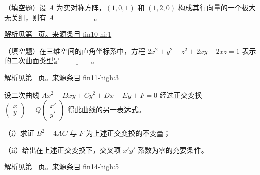 \documentclass[12pt,fontset=fandol]{ctexart}
\begin{document}
\begin{example}\label{ex:fin10-hi:1}

（填空题）设 $A$ 为实对称方阵，$(1,0,1)$ 和 $(1,2,0)$ 构成其行向量的一个极大无关组，则有 $A = $ $\underline{\qquad\qquad}$。

\par\hyperref[ans:fin10-hi:1]{解析见第~\pageref{ans:fin10-hi:1} 页。}\quad\href{https://github.com/lzxcr/cmc-mathematics/blob/64916fa1fdbc3e444a652eca204d5669058ee321/src/problems/finals/10/01.md}{来源条目 fin10-hi:1}

\end{example}

\begin{example}\label{ex:fin11-high:3}

（填空题）在三维空间的直角坐标系中，方程 $2x^{2}+y^{2}+z^{2}+2xy-2xz=1$ 表示的二次曲面类型是 $\underline{\qquad\qquad}$。

\par\hyperref[ans:fin11-high:3]{解析见第~\pageref{ans:fin11-high:3} 页。}\quad\href{https://github.com/lzxcr/cmc-mathematics/blob/64916fa1fdbc3e444a652eca204d5669058ee321/src/problems/finals/11/03.md}{来源条目 fin11-high:3}

\end{example}

\begin{example}\label{ex:fin14-high:5}

设二次曲线 $Ax^2+Bxy+Cy^2+Dx+Ey+F=0$ 经过正交变换 $\begin{pmatrix} x \\ y \end{pmatrix}=Q \begin{pmatrix} x' \\ y' \end{pmatrix}$ 得此曲线的另一表达式。

（i）求证 $B^2-4AC$ 与 $F$ 为上述正交变换的不变量；

（ii）给出在上述正交变换下，交叉项 $x'y'$ 系数为零的充要条件。

\par\hyperref[ans:fin14-high:5]{解析见第~\pageref{ans:fin14-high:5} 页。}\quad\href{https://github.com/lzxcr/cmc-mathematics/blob/64916fa1fdbc3e444a652eca204d5669058ee321/src/problems/finals/14/05.md}{来源条目 fin14-high:5}

\end{example}
\end{document}
